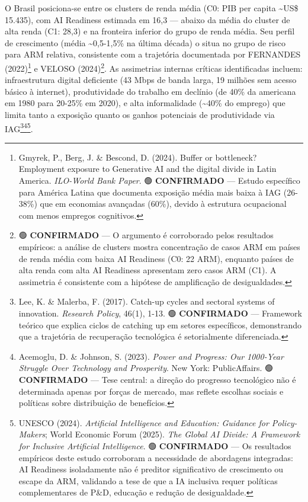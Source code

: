 \documentclass[
  brazilian,
  12pt,
]{article}
\begin{document}
O Brasil posiciona-se entre os clusters de renda média (C0: PIB per capita \textasciitilde US\$ 15.435), com AI Readiness estimada em 16,3 --- abaixo da média do cluster de alta renda (C1: 28,3) e na fronteira inferior do grupo de renda média. Seu perfil de crescimento (média \textasciitilde0,5-1,5\% na última década) o situa no grupo de risco para ARM relativa, consistente com a trajetória documentada por FERNANDES (2022)\footnote{Gmyrek, P., Berg, J. \& Bescond, D. (2024). Buffer or bottleneck? Employment exposure to Generative AI and the digital divide in Latin America. \emph{ILO-World Bank Paper}. 🟢 \textbf{CONFIRMADO} --- Estudo específico para América Latina que documenta exposição média mais baixa à IAG (26-38\%) que em economias avançadas (60\%), devido à estrutura ocupacional com menos empregos cognitivos.} e VELOSO (2024)\footnote{🟢 \textbf{CONFIRMADO} --- O argumento é corroborado pelos resultados empíricos: a análise de clusters mostra concentração de casos ARM em países de renda média com baixa AI Readiness (C0: 22 ARM), enquanto países de alta renda com alta AI Readiness apresentam zero casos ARM (C1). A assimetria é consistente com a hipótese de amplificação de desigualdades.}. As assimetrias internas críticas identificadas incluem: infraestrutura digital deficiente (43 Mbps de banda larga, 19 milhões sem acesso básico à internet), produtividade do trabalho em declínio (de 40\% da americana em 1980 para 20-25\% em 2020), e alta informalidade (\textasciitilde40\% do emprego) que limita tanto a exposição quanto os ganhos potenciais de produtividade via IAG\footnote{Lee, K. \& Malerba, F. (2017). Catch-up cycles and sectoral systems of innovation. \emph{Research Policy}, 46(1), 1-13. 🟢 \textbf{CONFIRMADO} --- Framework teórico que explica ciclos de catching up em setores específicos, demonstrando que a trajetória de recuperação tecnológica é setorialmente diferenciada.}\footnote{Acemoglu, D. \& Johnson, S. (2023). \emph{Power and Progress: Our 1000-Year Struggle Over Technology and Prosperity}. New York: PublicAffairs. 🟢 \textbf{CONFIRMADO} --- Tese central: a direção do progresso tecnológico não é determinada apenas por forças de mercado, mas reflete escolhas sociais e políticas sobre distribuição de benefícios.}\footnote{UNESCO (2024). \emph{Artificial Intelligence and Education: Guidance for Policy-Makers}; World Economic Forum (2025). \emph{The Global AI Divide: A Framework for Inclusive Artificial Intelligence}. 🟢 \textbf{CONFIRMADO} --- Os resultados empíricos deste estudo corroboram a necessidade de abordagens integradas: AI Readiness isoladamente não é preditor significativo de crescimento ou escape da ARM, validando a tese de que a IA inclusiva requer políticas complementares de P\&D, educação e redução de desigualdade.}.
\end{document}
